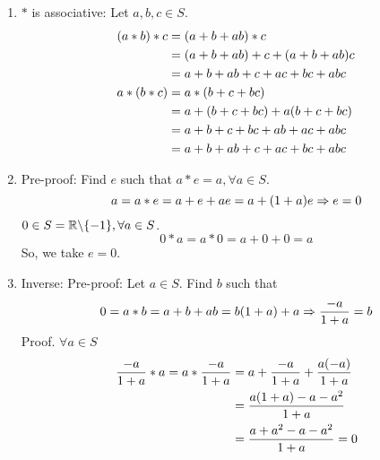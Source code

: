 \begin{solution}
\begin{enumerate}
        \begin{myspace}
            \begin{enumerate}[label=\textbf{(G\arabic*)}]
                \item $\ast$ is associative: Let $a, b, c \in S$.
                \begin{align*}
                    \qty(a \ast b) \ast c  &= \qty(a + b + ab) \ast c \\
                    &= \qty(a + b + ab) + c + \qty(a + b + ab)c  \\
                    &= a + b + ab + c + ac + bc + abc \\
                    a \ast \qty(b \ast c) &= a \ast \qty(b + c + bc) \\
                    &= a + \qty(b + c + bc) + a \qty(b + c + bc) \\
                    &= a + b + c + bc + ab + ac + abc \\
                    &=  a + b + ab + c + ac + bc + abc
                \end{align*}
                 \item Pre-proof: Find $e$ such that $a \ast e = a, \forall a \in S$.
                \[ a = a \ast e = a + e + ae = a + \qty(1 + a)e \Rightarrow e = 0\]
                $0 \in S = \mathbb{R} \backslash \qty{-1}, \forall a \in S$.
                \[ 0 \ast a = a \ast 0 = a + 0 + 0 = a \]
                So, we take $e = 0$.
                \item Inverse: Pre-proof:  Let $a \in S$. Find $b$ such that 
                \[ 0 = a \ast b = a + b + ab = b \qty(1 + a) + a \Rightarrow \frac{-a}{1 + a} = b \]
                Proof. $\forall a \in S$
                \begin{align*}
                    \frac{-a}{1 + a} \ast a = a \ast \frac{-a}{1 + a} &= a + \frac{-a}{1 + a} + \frac{a \qty(-a)}{1 + a} \\
                    &= \frac{a \qty(1 + a) - a - a^2}{1 + a} \\
                    &= \frac{a + a^2 - a - a^2}{1 + a} = 0
                \end{align*}


\end{enumerate}
\end{myspace}
\end{enumerate}
\end{solution}
